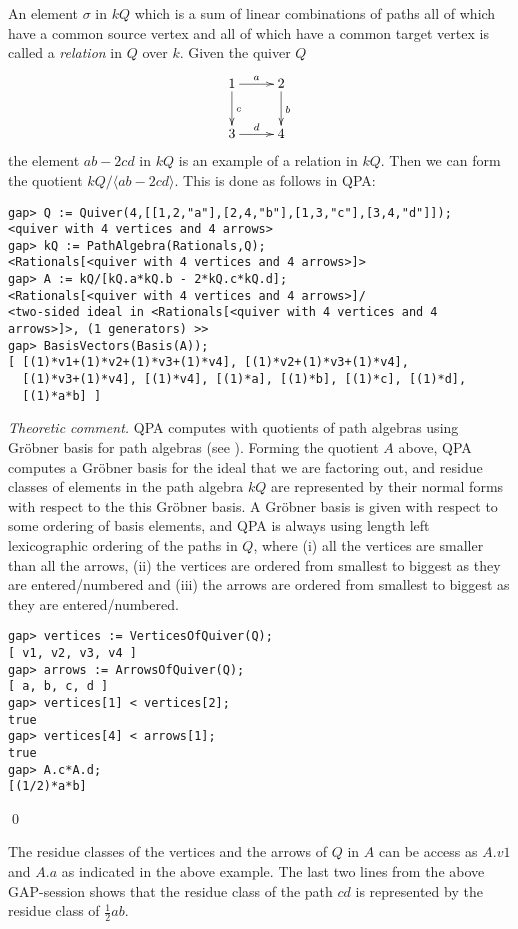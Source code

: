 \documentclass{amsart}
\theoremstyle{definition}
\theoremstyle{theoretic}
\newenvironment{theocomm}
{\medskip\small\textit{Theoretic comment.} }
{\qed\par\medskip}
\begin{document}
An element $\sigma$ in $kQ$ which is a sum of linear combinations of
paths all of which have a common source vertex and all of which have a
common target vertex is called a \emph{relation} in $Q$ over $k$.
Given the quiver $Q$
\[\xymatrix{
1\ar[r]^a\ar[d]^c & 2\ar[d]^b\\
3\ar[r]^d & 4
}\]
the element $ab - 2cd$ in $kQ$ is an example of a relation in $kQ$.
Then we can form the quotient $kQ/\langle ab - 2 cd\rangle$.  This is
done as follows in QPA:
\begin{verbatim}
gap> Q := Quiver(4,[[1,2,"a"],[2,4,"b"],[1,3,"c"],[3,4,"d"]]);
<quiver with 4 vertices and 4 arrows>
gap> kQ := PathAlgebra(Rationals,Q);
<Rationals[<quiver with 4 vertices and 4 arrows>]>
gap> A := kQ/[kQ.a*kQ.b - 2*kQ.c*kQ.d];
<Rationals[<quiver with 4 vertices and 4 arrows>]/
<two-sided ideal in <Rationals[<quiver with 4 vertices and 4
arrows>]>, (1 generators) >>
gap> BasisVectors(Basis(A));
[ [(1)*v1+(1)*v2+(1)*v3+(1)*v4], [(1)*v2+(1)*v3+(1)*v4], 
  [(1)*v3+(1)*v4], [(1)*v4], [(1)*a], [(1)*b], [(1)*c], [(1)*d], 
  [(1)*a*b] ]
\end{verbatim}
\begin{theocomm}
QPA computes with quotients of path algebras using Gr\"obner basis for
path algebras (see \cite{Green}).  Forming the quotient $A$ above, QPA
computes a Gr\"obner basis for the ideal that we are factoring out,
and residue classes of elements in the path algebra $kQ$ are
represented by their normal forms with respect to the this Gr\"obner
basis.  A Gr\"obner basis is given with respect to some ordering of
basis elements, and QPA is always using length left lexicographic
ordering of the paths in $Q$, where (i) all the vertices are smaller
than all the arrows, (ii) the vertices are ordered from smallest to
biggest as they are entered/numbered and (iii) the arrows are ordered
from smallest to biggest as they are entered/numbered.
\begin{verbatim}
gap> vertices := VerticesOfQuiver(Q);
[ v1, v2, v3, v4 ]
gap> arrows := ArrowsOfQuiver(Q);    
[ a, b, c, d ]
gap> vertices[1] < vertices[2];
true
gap> vertices[4] < arrows[1];
true
gap> A.c*A.d;
[(1/2)*a*b]
\end{verbatim}
\end{theocomm}

The residue classes of the vertices and the arrows of $Q$ in $A$ can
be access as $A.v1$ and $A.a$ as indicated in the above example.  The
last two lines from the above GAP-session shows that the residue class
of the path $cd$ is represented by the residue class of
$\frac{1}{2}ab$. 
\end{document}
